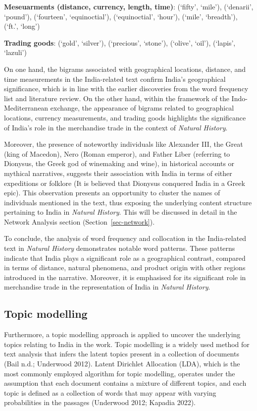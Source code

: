 \documentclass[
  12pt,
]{article}
\begin{document}
\textbf{Meseuarments (distance, currency, length, time)}: (`fifty',
`mile'), (`denarii', `pound'), (`fourteen', `equinoctial'),
(`equinoctial', `hour'), (`mile', `breadth'), (`ft.', `long')

\textbf{Trading goods}: (`gold', `silver'), (`precious', `stone'),
(`olive', `oil'), (`lapis', `lazuli')

On one hand, the bigrams associated with geographical locations,
distance, and time measurements in the India-related text confirm
India's geographical significance, which is in line with the earlier
discoveries from the word frequency list and literature review. On the
other hand, within the framework of the Indo-Mediterranean exchange, the
appearance of bigrams related to geographical locations, currency
measurements, and trading goods highlights the significance of India's
role in the merchandise trade in the context of \emph{Natural History}.

Moreover, the presence of noteworthy individuals like Alexander III, the
Great (king of Macedon), Nero (Roman emperor), and Father Liber
(referring to Dionysus, the Greek god of winemaking and wine), in
historical accounts or mythical narratives, suggests their association
with India in terms of either expeditions or folklore (It is believed
that Dionysus conquered India in a Greek epic). This observation
presents an opportunity to cluster the names of individuals mentioned in
the text, thus exposing the underlying content structure pertaining to
India in \emph{Natural History}. This will be discussed in detail in the
Network Analysis section (Section~\ref{sec-network}).

To conclude, the analysis of word frequency and collocation in the
India-related text in \emph{Natural History} demonstrates notable word
patterns. These patterns indicate that India plays a significant role as
a geographical contrast, compared in terms of distance, natural
phenomena, and product origin with other regions introduced in the
narrative. Moreover, it is emphasised for its significant role in
merchandise trade in the representation of India in \emph{Natural
History}.

\hypertarget{topic-modelling}{%
\subsection{Topic modelling}\label{topic-modelling}}

Furthermore, a topic modelling approach is applied to uncover the
underlying topics relating to India in the work. Topic modelling is a
widely used method for text analysis that infers the latent topics
present in a collection of documents (Bail n.d.; Underwood 2012). Latent
Dirichlet Allocation (LDA), which is the most commonly employed
algorithm for topic modelling, operates under the assumption that each
document contains a mixture of different topics, and each topic is
defined as a collection of words that may appear with varying
probabilities in the passages (Underwood 2012; Kapadia 2022).
\end{document}
